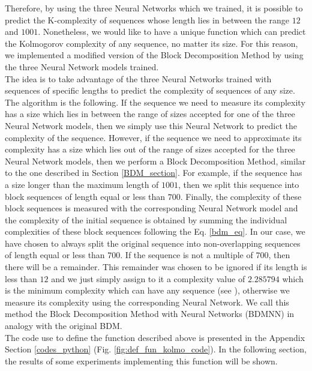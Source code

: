 Therefore, by using the three Neural Networks which we trained, it is possible to predict the K-complexity of sequences whose length lies in between the range $12$ and $1001$. Nonetheless, we would like to have a unique function which can predict the Kolmogorov complexity of any sequence, no matter its size. For this reason, we implemented a modified version of the Block Decomposition Method by using the three Neural Network models trained.\\

The idea is to take advantage of the three Neural Networks trained with sequences of specific lengths to predict the complexity of sequences of any size. The algorithm is the following. If the sequence we need to measure its complexity has a size which lies in between the range of sizes accepted for one of the three Neural Network models, then we simply use this Neural Network to predict the complexity of the sequence. However, if the sequence we need to approximate its complexity has a size which lies out of the range of sizes accepted for the three Neural Network models, then we perform a Block Decomposition Method, similar to the one described in Section \ref{BDM_section}. For example, if the sequence has a size longer than the maximum length of $1001$, then we split this sequence into block sequences of length equal or less than $700$. Finally, the complexity of these block sequences is measured with the corresponding Neural Network model and the complexity of the initial sequence is obtained by summing the individual complexities of these block sequences following the Eq. \ref{bdm_eq}. In our case, we have chosen to always split the original sequence into non-overlapping sequences of length equal or less than $700$. If the sequence is not a multiple of $700$, then there will be a remainder. This remainder was chosen to be ignored if its length is less than $12$ and we just simply assign to it a complexity value of $2.285794$ which is the minimum complexity which can have any sequence (see \cite{faibles_complexites}), otherwise we measure its complexity using the corresponding Neural Network. We call this method the Block Decomposition Method with Neural Networks (BDMNN) in analogy with the original BDM.\\

The code use to define the function described above is presented in the Appendix Section \ref{codes_python} (Fig. \ref{fig:def_fun_kolmo_code}). In the following section, the results of some experiments implementing this function will be shown.

